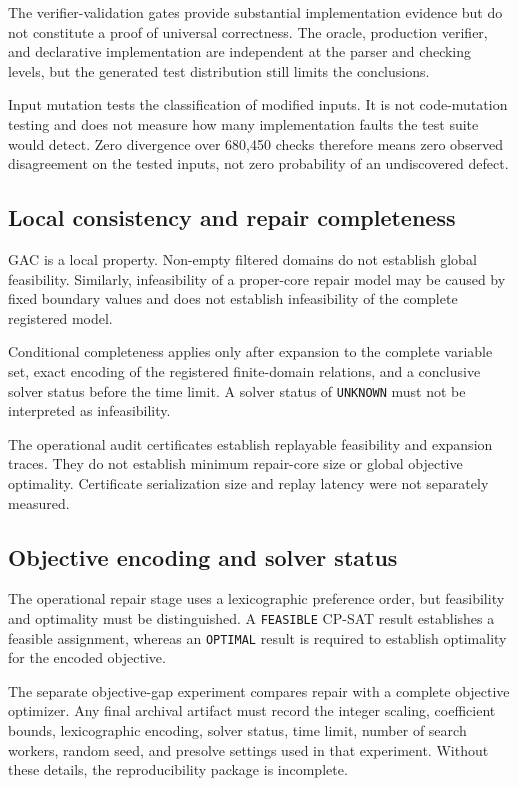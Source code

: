 \documentclass[pdflatex,sn-mathphys-num,iicol,oneside]{sn-jnl}
\newcommand{\gac}{\textsc{GAC}\xspace}
\newcommand{\cpsat}{\textsc{CP-SAT}\xspace}
\begin{document}
The verifier-validation gates provide substantial implementation
evidence but do not constitute a proof of universal correctness. The
oracle, production verifier, and declarative implementation are
independent at the parser and checking levels, but the generated test
distribution still limits the conclusions.

Input mutation tests the classification of modified inputs. It is not
code-mutation testing and does not measure how many implementation
faults the test suite would detect. Zero divergence over 680{,}450
checks therefore means zero observed disagreement on the tested
inputs, not zero probability of an undiscovered defect.

\subsection{Local consistency and repair completeness}

\gac is a local property. Non-empty filtered domains do not establish
global feasibility. Similarly, infeasibility of a proper-core repair
model may be caused by fixed boundary values and does not establish
infeasibility of the complete registered model.

Conditional completeness applies only after expansion to the complete
variable set, exact encoding of the registered finite-domain
relations, and a conclusive solver status before the time limit.
A solver status of \texttt{UNKNOWN} must not be interpreted as
infeasibility.

The operational audit certificates establish replayable feasibility
and expansion traces. They do not establish minimum repair-core size
or global objective optimality. Certificate serialization size and
replay latency were not separately measured.

\subsection{Objective encoding and solver status}

The operational repair stage uses a lexicographic preference order,
but feasibility and optimality must be distinguished. A
\texttt{FEASIBLE} \cpsat result establishes a feasible assignment,
whereas an \texttt{OPTIMAL} result is required to establish
optimality for the encoded objective.

The separate objective-gap experiment compares repair with a complete
objective optimizer. Any final archival artifact must record the
integer scaling, coefficient bounds, lexicographic encoding, solver
status, time limit, number of search workers, random seed, and
presolve settings used in that experiment. Without these details,
the reproducibility package is incomplete.
\end{document}
